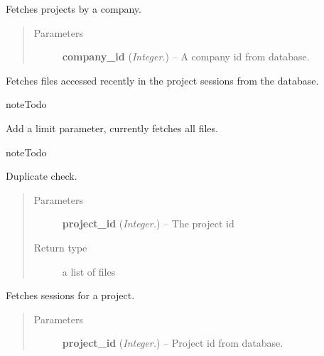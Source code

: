 \documentclass[letterpaper,10pt,english]{sphinxmanual}
\begin{document}

\begin{fulllineitems}
\label{api:controller.GetProjectsByCompany}
Fetches projects by a company.
\begin{quote}\begin{description}
\item[{Parameters}] \leavevmode
\textbf{company\_id} (\emph{Integer.}) -- A company id from database.

\end{description}\end{quote}

\end{fulllineitems}


\begin{fulllineitems}
\label{api:controller.GetRecentFiles}
Fetches files accessed recently in the project sessions from the database.

\begin{notice}{note}{Todo}

Add a limit parameter, currently fetches all files.
\end{notice}

\begin{notice}{note}{Todo}

Duplicate check.
\end{notice}
\begin{quote}\begin{description}
\item[{Parameters}] \leavevmode
\textbf{project\_id} (\emph{Integer.}) -- The project id

\item[{Return type}] \leavevmode
a list of files

\end{description}\end{quote}

\end{fulllineitems}


\begin{fulllineitems}
\label{api:controller.GetSessionsByProject}
Fetches sessions for a project.
\begin{quote}\begin{description}
\item[{Parameters}] \leavevmode
\textbf{project\_id} (\emph{Integer.}) -- Project id from database.

\end{description}\end{quote}

\end{fulllineitems}
\end{document}
